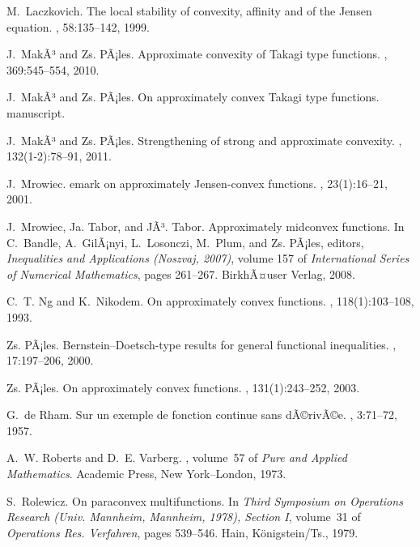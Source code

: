 \documentclass[12pt,leqno]{amsart}
\theoremstyle{definition}
\begin{document}
\begin{thebibliography}{10}
M.~Laczkovich.
\newblock The local stability of convexity, affinity and of the {J}ensen equation.
, 58:135--142, 1999.

J.~MakÃ³ and Zs. PÃ¡les.
\newblock Approximate convexity of {T}akagi type functions.
, 369:545--554, 2010.

J.~MakÃ³ and Zs. PÃ¡les.
\newblock On approximately convex {T}akagi type functions.
\newblock manuscript.

J.~MakÃ³ and Zs. PÃ¡les.
\newblock Strengthening of strong and approximate convexity.
, 132(1-2):78--91, 2011.

J.~Mrowiec.
emark on approximately {J}ensen-convex functions.
, 23(1):16--21, 2001.

J.~Mrowiec, Ja. Tabor, and JÃ³. Tabor.
\newblock Approximately midconvex functions.
\newblock In C.~Bandle, A.~GilÃ¡nyi, L.~Losonczi, M.~Plum, and Zs. PÃ¡les,
  editors, {\em Inequalities and Applications (Noszvaj, 2007)}, volume 157 of
  {\em International Series of Numerical Mathematics}, pages 261--267.
  BirkhÃ¤user Verlag, 2008.

C.~T. Ng and K.~Nikodem.
\newblock On approximately convex functions.
, 118(1):103--108, 1993.

Zs. PÃ¡les.
\newblock Bernstein--{D}oetsch-type results for general functional inequalities.
, 17:197--206, 2000.

Zs. PÃ¡les.
\newblock On approximately convex functions.
, 131(1):243--252, 2003.

G.~de Rham.
\newblock Sur un exemple de fonction continue sans dÃ©rivÃ©e.
, 3:71--72, 1957.

A.~W. Roberts and D.~E. Varberg.
, volume~57 of {\em Pure and Applied
  Mathematics}.
\newblock Academic Press, New York--London, 1973.

S.~Rolewicz.
\newblock On paraconvex multifunctions.
\newblock In {\em Third Symposium on Operations Research (Univ. Mannheim,
  Mannheim, 1978), Section I}, volume~31 of {\em Operations Res. Verfahren},
  pages 539--546. Hain, K\"onigstein/Ts., 1979.


\end{thebibliography}
\end{document}
